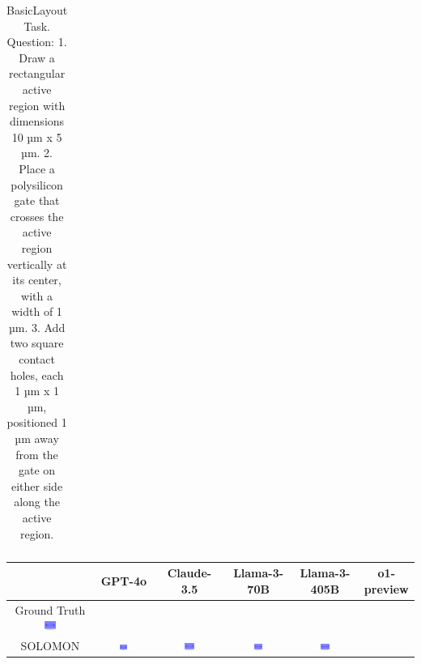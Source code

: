 \begin{table}[H]
\begin{tabular}{|c|c|c|c|c|c|}
    \hline
    \end{tabular}
    \caption{BasicLayout Task. Question: 1. Draw a rectangular active region with dimensions 10 µm x 5 µm.
2. Place a polysilicon gate that crosses the active region vertically at its center, with a width of 1 µm.
3. Add two square contact holes, each 1 µm x 1 µm, positioned 1 µm away from the gate on either side along the active region.}
\end{table}

\begin{table}[H]
    \centering
    \begin{tabular}{|c|c|c|c|c|c|}
    \hline
    & GPT-4o & Claude-3.5 & Llama-3-70B & Llama-3-405B & o1-preview \\
    \hline
    Ground Truth {\includegraphics[width=0.15\textwidth]{examples_png/MicrofluidicChip.png}} & & & & &  \\
    \hline
    SOLOMON & \includegraphics[width=0.15\textwidth]{./pool_all/png/gpt-4o_results/MicrofluidicChip.png} & \includegraphics[width=0.15\textwidth]{./pool_all/png/claude-3-5-sonnet-20240620_results/MicrofluidicChip.png} & \includegraphics[width=0.15\textwidth]{./pool_all/png/watsonx_meta-llama_llama-3-1-70b-instruct_results/MicrofluidicChip.png} & \includegraphics[width=0.15\textwidth]{./pool_all/png/watsonx_meta-llama_llama-3-405b-instruct_results/MicrofluidicChip.png} & \\
    \hline

\end{tabular}
\end{table}

